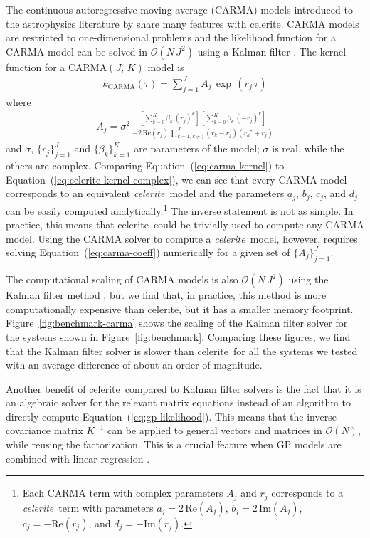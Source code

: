\documentclass[manuscript, letterpaper]{aastex6}
\newcommand{\project}[1]{\textsf{#1}}
\newcommand{\celerite}{\project{celerite}}
\newcommand{\celeriteterm}{\emph{celerite}}
\newcommand{\figureref}[1]{\ref{fig:#1}}
\newcommand{\Figure}[1]{Figure~\figureref{#1}}
\renewcommand{\eqref}[1]{\ref{eq:#1}}
\newcommand{\Eq}[1]{Equation~(\eqref{#1})}
\newcommand{\eq}[1]{\Eq{#1}}
\newcommand{\eqlabel}[1]{\label{eq:#1}}
\newcommand{\response}[1]{{#1}}
\newcommand{\responseb}[1]{{#1}}
\begin{document}
The continuous autoregressive moving average (CARMA) models introduced to the
astrophysics literature by \citet{Kelly:2014} share many features with
\celerite.
CARMA models are restricted to one-dimensional problems and the likelihood
function for a CARMA model can be solved in $\mathcal{O}(N\,J^2)$ using a
Kalman filter \citep{Kelly:2014}.
The kernel function for a CARMA$(J,\,K)$ model is
\begin{eqnarray}\eqlabel{carma-kernel}
    k_\mathrm{CARMA}(\tau) = \sum_{j=1}^{J} A_j\,\exp\,(r_j\,\tau)
\end{eqnarray}
where
\begin{eqnarray}\eqlabel{carma-coeff}
    A_j = \sigma^2 \,\frac{\left[\sum_{k=0}^K\beta_k\,{(r_j)}^k\right]\,
        \left[\sum_{k=0}^K\beta_k\,{(-r_j)}^k\right]}
    {-2\,\mathrm{Re}(r_j)\,\prod_{k=1,\,k \ne j}^{J}(r_k-r_j)({r_k}^*+r_j)}
\end{eqnarray}
and $\sigma$, $\{r_j\}_{j=1}^{J}$ and $\{\beta_k\}_{k=1}^K$ are parameters
of the model; $\sigma$ is real, while the others are complex.
Comparing \eq{carma-kernel} to \eq{celerite-kernel-complex}, we can see that
every CARMA model corresponds to an equivalent \celeriteterm\ model and the
parameters $a_j$, $b_j$, $c_j$, and $d_j$ can be easily computed
analytically.\footnote{\responseb{Each CARMA term with complex parameters
        $A_j$ and $r_j$ corresponds to a \celeriteterm\ term with parameters $a_j =
            2\,\mathrm{Re}(A_j)$, $b_j = 2\,\mathrm{Im}(A_j)$, $c_j = -\mathrm{Re}(r_j)$,
        and $d_j = -\mathrm{Im}(r_j)$.}}
The inverse statement is not as simple.
In practice, this means that \celerite\ could be trivially used to compute any
CARMA model.
Using the CARMA solver to compute a \celeriteterm\ model, however, requires
solving \eq{carma-coeff} numerically for a given set of $\{A_j\}_{j=1}^J$.

\response{
    The computational scaling of CARMA models is also $\mathcal{O}(N\,J^2)$ using
    the Kalman filter method \citep{Kelly:2014}, but we find that, in practice,
    this method is more computationally expensive than \celerite, but it has a
    smaller memory footprint.
    \Figure{benchmark-carma} shows the scaling of the Kalman filter solver for the
    systems shown in \Figure{benchmark}.
    Comparing these figures, we find that the Kalman filter solver is slower than
    \celerite\ for all the systems we tested with an average difference of about
    an order of magnitude.

    Another benefit of \celerite\ compared to Kalman filter solvers is the fact
    that it is an algebraic solver for the relevant matrix equations instead of
    an algorithm to directly compute \eq{gp-likelihood}.
    This means that the inverse covariance matrix $K^{-1}$ can be applied to
    general vectors and matrices in $\mathcal{O}(N)$, while reusing the
    factorization.
    This is a crucial feature when GP models are combined with linear regression
    \citep[for example][]{Luger:2017}.
}
\end{document}
